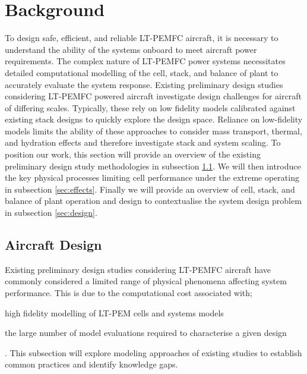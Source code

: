 \section{Background} \label{sec:background}
To design safe, efficient, and reliable LT-PEMFC aircraft, it is necessary to understand the ability of the systems onboard to meet aircraft power requirements.
The complex nature of LT-PEMFC power systems necessitates detailed computational modelling of the cell, stack, and balance of plant to accurately evaluate the system response.
Existing preliminary design studies considering LT-PEMFC powered aircraft investigate design challenges for aircraft of differing scales.
Typically, these rely on low fidelity models calibrated against existing stack designs to quickly explore the design space.
Reliance on low-fidelity models limits the ability of these approaches to consider mass transport, thermal, and hydration effects and therefore investigate stack and system scaling.
To position our work, this section will provide an overview of the existing preliminary design study methodologies in subsection \ref{sec:lit}.
We will then introduce the key physical processes limiting cell performance under the extreme operating in subsection \ref{sec:effects}.
Finally we will provide an overview of cell, stack, and balance of plant operation and design to contextualise the system design problem in subsection \ref{sec:design}.

\subsection{Aircraft Design} \label{sec:lit}
Existing preliminary design studies considering LT-PEMFC aircraft have commonly considered a limited range of physical phenomena affecting system performance.
This is due to the computational cost associated with; \begin{enumerate*} \item high fidelity modelling of LT-PEM cells and systems models \item the large number of model evaluations required to characterise a given design\end{enumerate*}.
This subsection will explore modeling approaches of existing studies to establish common practices and identify knowledge gaps.

